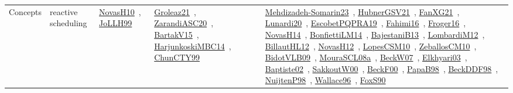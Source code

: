 {\begin{longtable}{lp{3cm}>{\raggedright\arraybackslash}p{6cm}>{\raggedright\arraybackslash}p{6cm}>{\raggedright\arraybackslash}p{8cm}}
Concepts & reactive scheduling & \href{../works/NovasH10.pdf}{NovasH10}~\cite{NovasH10}, \href{../works/JoLLH99.pdf}{JoLLH99}~\cite{JoLLH99} & \href{../works/Groleaz21.pdf}{Groleaz21}~\cite{Groleaz21}, \href{../works/ZarandiASC20.pdf}{ZarandiASC20}~\cite{ZarandiASC20}, \href{../works/BartakV15.pdf}{BartakV15}~\cite{BartakV15}, \href{../works/HarjunkoskiMBC14.pdf}{HarjunkoskiMBC14}~\cite{HarjunkoskiMBC14}, \href{../works/ChunCTY99.pdf}{ChunCTY99}~\cite{ChunCTY99} & \href{../works/Mehdizadeh-Somarin23.pdf}{Mehdizadeh-Somarin23}~\cite{Mehdizadeh-Somarin23}, \href{../works/HubnerGSV21.pdf}{HubnerGSV21}~\cite{HubnerGSV21}, \href{../works/FanXG21.pdf}{FanXG21}~\cite{FanXG21}, \href{../works/Lunardi20.pdf}{Lunardi20}~\cite{Lunardi20}, \href{../works/EscobetPQPRA19.pdf}{EscobetPQPRA19}~\cite{EscobetPQPRA19}, \href{../works/Fahimi16.pdf}{Fahimi16}~\cite{Fahimi16}, \href{../works/Froger16.pdf}{Froger16}~\cite{Froger16}, \href{../works/NovasH14.pdf}{NovasH14}~\cite{NovasH14}, \href{../works/BonfiettiLM14.pdf}{BonfiettiLM14}~\cite{BonfiettiLM14}, \href{../works/BajestaniB13.pdf}{BajestaniB13}~\cite{BajestaniB13}, \href{../works/LombardiM12.pdf}{LombardiM12}~\cite{LombardiM12}, \href{../works/BillautHL12.pdf}{BillautHL12}~\cite{BillautHL12}, \href{../works/NovasH12.pdf}{NovasH12}~\cite{NovasH12}, \href{../works/LopesCSM10.pdf}{LopesCSM10}~\cite{LopesCSM10}, \href{../works/ZeballosCM10.pdf}{ZeballosCM10}~\cite{ZeballosCM10}, \href{../works/BidotVLB09.pdf}{BidotVLB09}~\cite{BidotVLB09}, \href{../works/MouraSCL08a.pdf}{MouraSCL08a}~\cite{MouraSCL08a}, \href{../works/BeckW07.pdf}{BeckW07}~\cite{BeckW07}, \href{../works/Elkhyari03.pdf}{Elkhyari03}~\cite{Elkhyari03}, \href{../works/Baptiste02.pdf}{Baptiste02}~\cite{Baptiste02}, \href{../works/SakkoutW00.pdf}{SakkoutW00}~\cite{SakkoutW00}, \href{../works/BeckF00.pdf}{BeckF00}~\cite{BeckF00}, \href{../works/PapaB98.pdf}{PapaB98}~\cite{PapaB98}, \href{../works/BeckDDF98.pdf}{BeckDDF98}~\cite{BeckDDF98}, \href{../works/NuijtenP98.pdf}{NuijtenP98}~\cite{NuijtenP98}, \href{../works/Wallace96.pdf}{Wallace96}~\cite{Wallace96}, \href{../works/FoxS90.pdf}{FoxS90}~\cite{FoxS90}\\

\end{longtable}}
